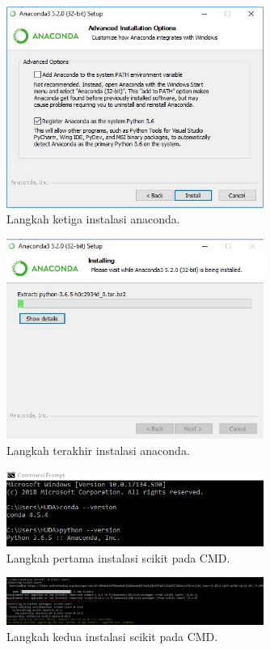 \begin{figure}[ht]\centerline{\includegraphics[width=0.75\textwidth]{figures/4.JPG}}\caption{Langkah ketiga instalasi anaconda.}\end{figure}
\begin{figure}[ht]\centerline{\includegraphics[width=0.75\textwidth]{figures/5.JPG}}\caption{Langkah terakhir instalasi anaconda.}\end{figure}
\begin{figure}[ht]\centerline{\includegraphics[width=0.75\textwidth]{figures/6.JPG}}\caption{Langkah pertama instalasi scikit pada CMD.}\end{figure}
\begin{figure}[ht]\centerline{\includegraphics[width=0.75\textwidth]{figures/7.JPG}}\caption{Langkah kedua instalasi scikit pada CMD.}\end{figure}

